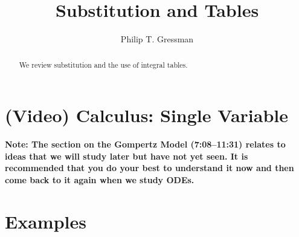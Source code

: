 \documentclass{ximera}
\title{Substitution and Tables}
\author{Philip T. Gressman}
\begin{document}
\begin{abstract}
We review substitution and the use of integral tables.
\end{abstract}
\maketitle


\section*{(Video) Calculus: Single Variable}
\textbf{Note: The section on the Gompertz Model (7:08--11:31) relates to ideas that we will study later but have not yet seen. It is recommended that you do your best to understand it now and then come back to it again when we study ODEs.}


\section*{Examples}
\end{document}
